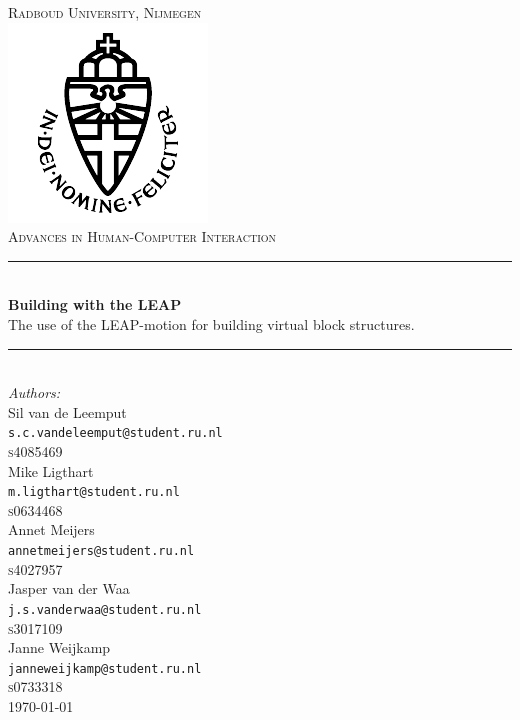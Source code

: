 \newcommand{\HRule}{\rule{\linewidth}{0.5mm}}

\begin{titlepage}

\begin{center}



\textsc{\LARGE Radboud University, Nijmegen}\\

\includegraphics[scale=0.8]{imgs/rulogo.png}\\[1cm]

\textsc{\Large Advances in Human-Computer Interaction}\\[0.5cm]



\HRule \\[0.4cm]
{ \huge \bfseries Building with the LEAP}\\[0.3cm]
{\Large The use of the LEAP-motion for building virtual block structures.}

\HRule \\[1cm]

{\large \emph{Authors:}\\[0.2cm]
Sil van de Leemput\\
\texttt{s.c.vandeleemput@student.ru.nl}\\[0.08cm]
\textsc{s4085469}\\[0.5cm]
Mike Ligthart\\
\texttt{m.ligthart@student.ru.nl}\\[0.08cm]
\textsc{s0634468}\\[0.5cm]
Annet Meijers\\
\texttt{annetmeijers@student.ru.nl}\\[0.08cm]
\textsc{s4027957}\\[0.5cm]
Jasper van der Waa\\
\texttt{j.s.vanderwaa@student.ru.nl}\\[0.08cm]
\textsc{s3017109}\\[0.5cm]
Janne Weijkamp\\
\texttt{janneweijkamp@student.ru.nl}\\[0.08cm]
\textsc{s0733318}}\\[2cm]
\today
\end{center}

\end{titlepage}
